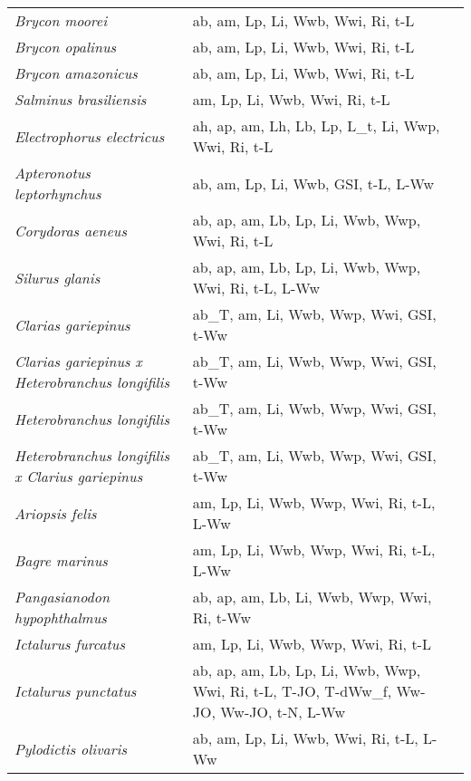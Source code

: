 {\begin{longtable}[c]{p{3.5cm}p{5.5cm}p{5.5cm}}
\emph{Brycon moorei} &  ab, am, Lp, Li, Wwb, Wwi, Ri, t-L & \citet{BaraLuca2005,Manc2017,BaraLuca2010} \\
\emph{Brycon opalinus} &  ab, am, Lp, Li, Wwb, Wwi, Ri, t-L & \citet{GomiCarm2007} \\
\emph{Brycon amazonicus} &  ab, am, Lp, Li, Wwb, Wwi, Ri, t-L & \citet{GuerAmad2018} \\
\emph{Salminus brasiliensis} &  am, Lp, Li, Wwb, Wwi, Ri, t-L & \citet{ZuliAmbr2016} \\
\emph{Electrophorus electricus} &  ah, ap, am, Lh, Lb, Lp, L\_t, Li, Wwp, Wwi, Ri, t-L & \citet{AssuSchw1995,SantVari2013} \\
\emph{Apteronotus leptorhynchus} &  ab, am, Lp, Li, Wwb, GSI, t-L, L-Ww & \citet{IlieSirb2014,KirsSchu2002} \\
\emph{Corydoras aeneus} &  ab, ap, am, Lb, Lp, Li, Wwb, Wwp, Wwi, Ri, t-L & \citet{HuysMoer2009,Kooy2010} \\
\emph{Silurus glanis} &  ab, ap, am, Lb, Lp, Li, Wwb, Wwp, Wwi, Ri, t-L, L-Ww & \citet{AlpKara2011} \\
\emph{Clarias gariepinus} &  ab\_T, am, Li, Wwb, Wwp, Wwi, GSI, t-Ww & \citet{LegeTeug1992} \\
\emph{Clarias gariepinus x Heterobranchus longifilis} &  ab\_T, am, Li, Wwb, Wwp, Wwi, GSI, t-Ww & \citet{LegeTeug1992} \\
\emph{Heterobranchus longifilis} &  ab\_T, am, Li, Wwb, Wwp, Wwi, GSI, t-Ww & \citet{LegeTeug1992} \\
\emph{Heterobranchus longifilis x Clarius gariepinus} &  ab\_T, am, Li, Wwb, Wwp, Wwi, GSI, t-Ww & \citet{LegeTeug1992} \\
\emph{Ariopsis felis} &  am, Lp, Li, Wwb, Wwp, Wwi, Ri, t-L, L-Ww & \citet{FlinMidw2019} \\
\emph{Bagre marinus} &  am, Lp, Li, Wwb, Wwp, Wwi, Ri, t-L, L-Ww & \citet{FlinMidw2019} \\
\emph{Pangasianodon hypophthalmus} &  ab, ap, am, Lb, Li, Wwb, Wwp, Wwi, Ri, t-Ww & \citet{MukaTuza2010,LegeSuba1998,ChowChan2020} \\
\emph{Ictalurus furcatus} &  am, Lp, Li, Wwb, Wwp, Wwi, Ri, t-L &  \\
\emph{Ictalurus punctatus} &  ab, ap, am, Lb, Lp, Li, Wwb, Wwp, Wwi, Ri, t-L, T-JO, T-dWw\_f, Ww-JO, Ww-JO, t-N, L-Ww & \citet{Pawi2004,SakaIrwi2008,Grah1999,TyusNiki1990,JearBrow1971,MoodMitc2015,RaibJahn1991,AndrMats1975,AndrStic1972} \\
\emph{Pylodictis olivaris} &  ab, am, Lp, Li, Wwb, Wwi, Ri, t-L, L-Ww & \citet{GrabIsel2004} \\

\end{longtable}}
